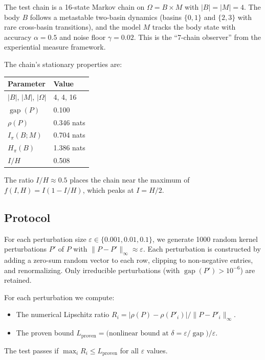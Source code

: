 \documentclass[11pt,a4paper]{article}
\DeclareMathOperator{\gap}{gap}
\begin{document}
The test chain is a 16-state Markov chain on $\Omega = B \times M$
with $|B| = |M| = 4$.  The body $B$ follows a metastable two-basin
dynamics (basins $\{0,1\}$ and $\{2,3\}$ with rare cross-basin
transitions), and the model $M$ tracks the body state with accuracy
$\alpha = 0.5$ and noise floor $\gamma = 0.02$.  This is the ``7-chain
observer'' from the experiential measure framework.

The chain's stationary properties are:
\begin{center}
\begin{tabular}{@{}ll@{}}
\toprule
Parameter & Value \\
\midrule
$|B|$, $|M|$, $|\Omega|$ & 4, 4, 16 \\
$\gap(P)$ & 0.100 \\
$\rho(P)$ & 0.346 nats \\
$I_\pi(B;M)$ & 0.704 nats \\
$H_\pi(B)$ & 1.386 nats \\
$I/H$ & 0.508 \\
\bottomrule
\end{tabular}
\end{center}

The ratio $I/H \approx 0.5$ places the chain near the maximum of
$f(I,H) = I(1-I/H)$, which peaks at $I = H/2$.

\subsection{Protocol}

For each perturbation size $\varepsilon \in \{0.001, 0.01, 0.1\}$,
we generate 1000 random kernel perturbations $P'$ of $P$ with
$\|P - P'\|_\infty \approx \varepsilon$.  Each perturbation is
constructed by adding a zero-sum random vector to each row, clipping
to non-negative entries, and renormalizing.  Only irreducible
perturbations (with $\gap(P') > 10^{-6}$) are retained.

For each perturbation we compute:
\begin{itemize}
  \item The numerical Lipschitz ratio
    $R_i = |\rho(P) - \rho(P'_i)| / \|P - P'_i\|_\infty$.
  \item The proven bound
    $L_{\mathrm{proven}} =
    \text{(nonlinear bound at $\delta = \varepsilon/\gap$)} / \varepsilon$.
\end{itemize}

The test passes if $\max_i R_i \le L_{\mathrm{proven}}$ for all
$\varepsilon$ values.
\end{document}

